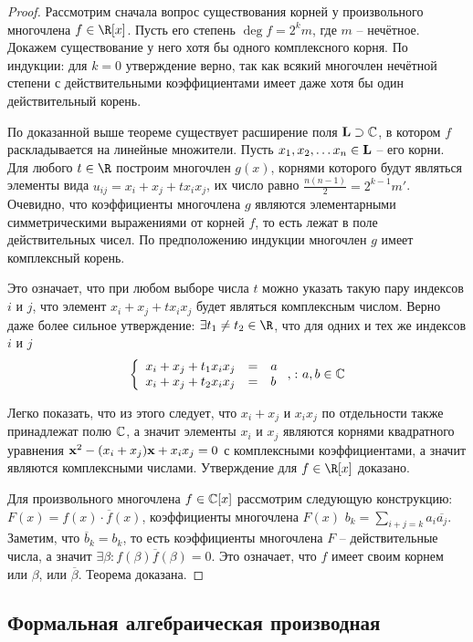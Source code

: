 \begin{proof}
  Рассмотрим сначала вопрос существования корней у произвольного многочлена $f\in\R[x]$. Пусть его степень $\deg f=2^km$, где $m$ -- нечётное. Докажем существование у него хотя бы одного комплексного корня. По индукции: для $k=0$ утверждение верно, так как всякий многочлен нечётной степени с действительными коэффициентами имеет даже хотя бы один действительный корень.
    
    По доказанной выше теореме существует расширение поля $\mathbf{L}\supset\mathbb{C}$, в котором $f$ раскладывается на линейные множители. Пусть $x_1,x_2,\dots x_n\in\mathbf{L}$ -- его корни. Для любого $t\in\R$ построим многочлен $g(x)$, корнями которого будут являться элементы вида $u_{ij}=x_i+x_j+tx_ix_j$, их число равно $\frac{n(n-1)}2=2^{k-1}m'$. Очевидно, что коэффициенты многочлена $g$ являются элементарными симметрическими выражениями от корней $f$, то есть лежат в поле действительных чисел. По предположению индукции многочлен $g$ имеет комплексный корень.
    
    Это означает, что при любом выборе числа $t$ можно указать такую пару индексов $i$ и $j$, что элемент $x_i+x_j+tx_ix_j$ будет являться комплексным числом. Верно даже более сильное утверждение: $\exists t_1\ne t_2\in\R$, что для одних и тех же индексов $i$ и $j$
    $$
    \left\{
      \begin{array}{lll}
        x_i+x_j+t_1x_ix_j&=&a\\
        x_i+x_j+t_2x_ix_j&=&b
      \end{array}\right.,\colon a,b\in\mathbb{C}
    $$
    
    Легко показать, что из этого следует, что $x_i+x_j$ и $x_ix_j$ по отдельности также принадлежат полю $\mathbb{C}$, а значит элементы $x_i$ и $x_j$ являются корнями квадратного уравнения $\xb^2\bw-(x_i\bw+x_j)\xb\bw+x_ix_j\bw=0$ с комплексными коэффициентами, а значит являются комплексными числами. Утверждение для $f\in\R[x]$ доказано.
    
    Для произвольного многочлена $f\in\mathbb{C}[x]$ рассмотрим следующую конструкцию: $F(x)=f(x)\cdot\overline{f}(x)$, коэффициенты многочлена $F(x)$ $b_k=\sum\limits_{i+j=k}a_i\overline{a_j}$. Заметим, что $\overline{b}_k=b_k$, то есть коэффициенты многочлена $F$ -- действительные числа, а значит $\exists\beta\colon f(\beta)\overline{f}(\beta)=0$. Это означает, что $f$ имеет своим корнем или $\beta$, или $\overline\beta$. Теорема доказана.
\end{proof}

\subsection{Формальная алгебраическая производная}

